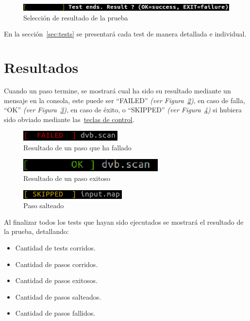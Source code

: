 \documentclass{article}
\begin{document}
\begin{figure}[h]
\centering
\includegraphics[scale=0.50]{testaccept}
\caption{Selección de resultado de la prueba}
\label{fig:accept_result}
\end{figure}

En la sección~\ref{sec:tests} se presentará cada test de manera detallada e individual.

\FloatBarrier

\section{Resultados}
Cuando un paso termine, se mostrará cual ha sido su resultado mediante un mensaje en la consola, este puede ser ``FAILED'' \textit{(ver Figura~\ref{fig:test_failed})}, en caso de falla, ``OK'' \textit{(ver Figura~\ref{fig:test_successful})}, en caso de éxito, o ``SKIPPED'' \textit{(ver Figura~\ref{fig:test_skipped})} si hubiera sido obviado mediante las~\hyperref[sec:control_keys]{teclas de control}.

\begin{figure}[h]
\centering
\includegraphics[scale=0.50]{testfailed}
\caption{Resultado de un paso que ha fallado}
\label{fig:test_failed}
\end{figure}
\FloatBarrier
\begin{figure}[h]
\centering
\includegraphics[scale=0.50]{testok}
\caption{Resultado de un paso exitoso}
\label{fig:test_successful}
\end{figure}
\FloatBarrier
\begin{figure}[h]
\centering
\includegraphics[scale=0.50]{testskipped}
\caption{Paso salteado}
\label{fig:test_skipped}
\end{figure}

\FloatBarrier

Al finalizar todos los tests que hayan sido ejecutados se mostrará el resultado de la prueba, detallando:

\begin{itemize}
	\item Cantidad de tests corridos.
	\item Cantidad de pasos corridos.
	\item Cantidad de pasos exitosos.
	\item Cantidad de pasos salteados.
	\item Cantidad de pasos fallidos.
\end{itemize}
\end{document}
